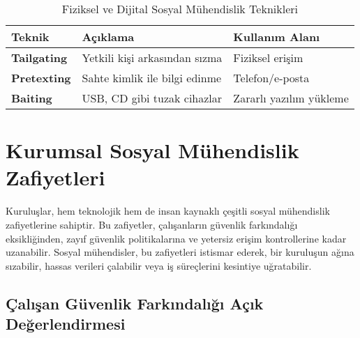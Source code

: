 \begin{table}[htbp]
\centering
\caption{Fiziksel ve Dijital Sosyal Mühendislik Teknikleri}
\begin{tabularx}{\textwidth}{|p{4cm}|X|p{4cm}|}
\hline
\rowcolor{tableheadcolor}
\textbf{Teknik} & \textbf{Açıklama} & \textbf{Kullanım Alanı}  \\
\hline
\textbf{Tailgating} & Yetkili kişi arkasından sızma & Fiziksel erişim  \\
\hline
\textbf{Pretexting} & Sahte kimlik ile bilgi edinme & Telefon/e-posta  \\
\hline
\textbf{Baiting} & USB, CD gibi tuzak cihazlar & Zararlı yazılım yükleme  \\
\hline
\end{tabularx}
\end{table}

\section{Kurumsal Sosyal Mühendislik Zafiyetleri}

Kuruluşlar, hem teknolojik hem de insan kaynaklı çeşitli sosyal mühendislik zafiyetlerine sahiptir. Bu zafiyetler, çalışanların güvenlik farkındalığı eksikliğinden, zayıf güvenlik politikalarına ve yetersiz erişim kontrollerine kadar uzanabilir. Sosyal mühendisler, bu zafiyetleri istismar ederek, bir kuruluşun ağına sızabilir, hassas verileri çalabilir veya iş süreçlerini kesintiye uğratabilir.

\subsection{Çalışan Güvenlik Farkındalığı Açık Değerlendirmesi}

